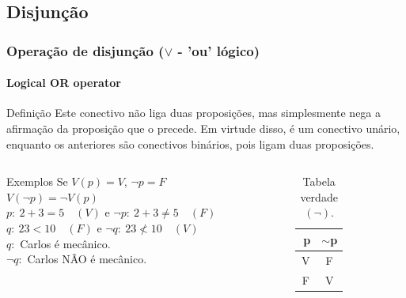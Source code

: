 \documentclass[10pt, headsepline, captions=tableabove,xcolor=table]{beamer}
\begin{document}
\subsection{Disjunção}
%
\begin{frame}[t]
    \frametitle{Operação de disjunção ($\lor$ - 'ou' lógico)}
    \framesubtitle{Logical OR operator}
    \begin{block}{Definição}
        Este conectivo não liga duas proposições, mas simplesmente nega a afirmação da proposição que o precede. Em virtude disso, é um conectivo unário, enquanto os anteriores são conectivos binários, pois ligam duas proposições.
    \end{block}
    \vspace{-4mm}
    \begin{columns}[t]
        \begin{column}{0.6\textwidth}
            \begin{exampleblock}{Exemplos}
                Se $V(p) = V$, $\lnot p = F$ \\ [2pt]
                $V(\lnot p) = \lnot V(p)$ \\ [2pt]
                $p:~2+3=5\quad (V)$ e $\lnot p:~2+3 \neq 5\quad (F)$ \\ [2pt]
                $q:~23 < 10 \quad (F)$ e $\lnot q:~23 \nless 10 \quad (V)$ \\[2pt]
                $q:$ Carlos é mecânico. \\[2pt]
                $\lnot q:$ Carlos NÃO é mecânico.
            \end{exampleblock}
        \end{column}
        \hspace{-3mm}
        \begin{column}{0.4\textwidth}
            \begin{table}[t]
                \caption{Tabela verdade $(\lnot)$.}
                \label{tab:tabela-ou}
                \begin{tabular}{|c|c|}
                \hline
                \rowcolor[HTML]{EFEFEF} 
                \textbf{$~$p} & \textbf{$\sim$p} \\ \hline
                V          & F                \\ \hline
                F          & V                \\ \hline
                \end{tabular}
            \end{table}
        \end{column}
    \end{columns}
\end{frame}
%
\end{document}
